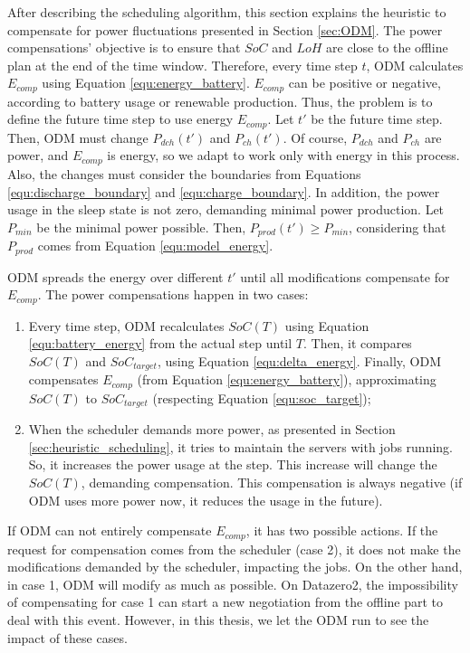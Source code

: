 After describing the scheduling algorithm, this section explains the heuristic to compensate for power fluctuations presented in Section \ref{sec:ODM}. The power compensations' objective is to ensure that $SoC$ and $LoH$ are close to the offline plan at the end of the time window. Therefore, every time step $t$, ODM calculates $E_{comp}$ using Equation \ref{equ:energy_battery}. $E_{comp}$ can be positive or negative, according to battery usage or renewable production. Thus, the problem is to define the future time step to use energy $E_{comp}$. Let $t'$ be the future time step. Then, ODM must change $P_{dch}(t')$ and $P_{ch}(t')$. Of course, $P_{dch}$ and $P_{ch}$ are power, and $E_{comp}$ is energy, so we adapt to work only with energy in this process. Also, the changes must consider the boundaries from Equations \ref{equ:discharge_boundary} and \ref{equ:charge_boundary}. In addition, the power usage in the sleep state is not zero, demanding minimal power production. Let $P_{min}$ be the minimal power possible. Then, $P_{prod}(t') \ge P_{min}$, considering that $P_{prod}$ comes from Equation \ref{equ:model_energy}. 

ODM spreads the energy over different $t'$ until all modifications compensate for $E_{comp}$. The power compensations happen in two cases:
\begin{enumerate}
    \item Every time step, ODM recalculates $SoC(T)$ using Equation \ref{equ:battery_energy} from the actual step until $T$. Then, it compares $SoC(T)$ and $SoC_{target}$, using Equation \ref{equ:delta_energy}. Finally, ODM compensates $E_{comp}$ (from Equation \ref{equ:energy_battery}), approximating $SoC(T)$ to $SoC_{target}$ (respecting Equation \ref{equ:soc_target});
    \item When the scheduler demands more power, as presented in Section \ref{sec:heuristic_scheduling}, it tries to maintain the servers with jobs running. So, it increases the power usage at the step. This increase will change the $SoC(T)$, demanding compensation. This compensation is always negative (if ODM uses more power now, it reduces the usage in the future).
\end{enumerate}

If ODM can not entirely compensate $E_{comp}$, it has two possible actions. If the request for compensation comes from the scheduler (case 2), it does not make the modifications demanded by the scheduler, impacting the jobs. On the other hand, in case 1, ODM will modify as much as possible. On Datazero2, the impossibility of compensating for case 1 can start a new negotiation from the offline part to deal with this event. However, in this thesis, we let the ODM run to see the impact of these cases.

